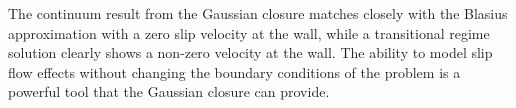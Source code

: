 \documentclass[titlepage,11pt,letterpaper]{article}
\begin{document}
The continuum result from the Gaussian closure matches closely with the Blasius 
approximation with a zero slip velocity at the wall, while a transitional regime solution 
clearly shows a non-zero velocity at the wall. The ability to model slip flow effects 
without changing the boundary conditions of the problem is a powerful tool that the 
Gaussian closure can provide.
%
%
\end{document}
